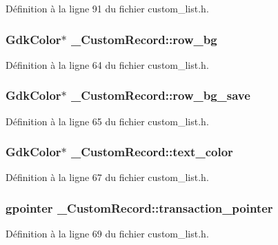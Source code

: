 Définition à la ligne 91 du fichier custom\_\-list.h.

\subsubsection[{row\_\-bg}]{\setlength{\rightskip}{0pt plus 5cm}GdkColor$\ast$ {\bf \_\-CustomRecord::row\_\-bg}}\label{struct__CustomRecord_a3b4f01fa0ed972c3446215cbe3fbdf56}


Définition à la ligne 64 du fichier custom\_\-list.h.

\subsubsection[{row\_\-bg\_\-save}]{\setlength{\rightskip}{0pt plus 5cm}GdkColor$\ast$ {\bf \_\-CustomRecord::row\_\-bg\_\-save}}\label{struct__CustomRecord_a7f10052deea3d5ebec35f030673e8253}


Définition à la ligne 65 du fichier custom\_\-list.h.

\subsubsection[{text\_\-color}]{\setlength{\rightskip}{0pt plus 5cm}GdkColor$\ast$ {\bf \_\-CustomRecord::text\_\-color}}\label{struct__CustomRecord_a491bd83af15a416e2336ca3bcc93b69d}


Définition à la ligne 67 du fichier custom\_\-list.h.

\subsubsection[{transaction\_\-pointer}]{\setlength{\rightskip}{0pt plus 5cm}gpointer {\bf \_\-CustomRecord::transaction\_\-pointer}}\label{struct__CustomRecord_a302b5408b8f955ac2a62e02a6f287477}


Définition à la ligne 69 du fichier custom\_\-list.h.

